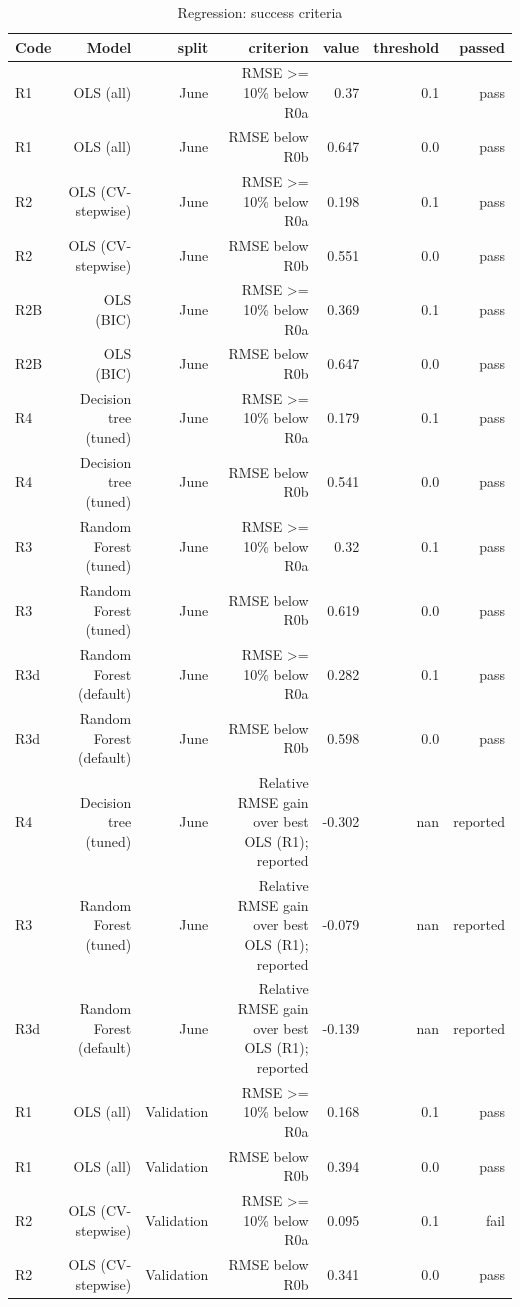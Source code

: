 \begin{table}[htbp]
\centering
\small
\caption{Regression: success criteria}
\begin{tabular}{lrrrrrr}
\toprule
Code & Model & split & criterion & value & threshold & passed \\
\midrule
R1 & OLS (all) & June & RMSE >= 10\% below R0a & 0.37 & 0.1 & pass \\
R1 & OLS (all) & June & RMSE below R0b & 0.647 & 0.0 & pass \\
R2 & OLS (CV-stepwise) & June & RMSE >= 10\% below R0a & 0.198 & 0.1 & pass \\
R2 & OLS (CV-stepwise) & June & RMSE below R0b & 0.551 & 0.0 & pass \\
R2B & OLS (BIC) & June & RMSE >= 10\% below R0a & 0.369 & 0.1 & pass \\
R2B & OLS (BIC) & June & RMSE below R0b & 0.647 & 0.0 & pass \\
R4 & Decision tree (tuned) & June & RMSE >= 10\% below R0a & 0.179 & 0.1 & pass \\
R4 & Decision tree (tuned) & June & RMSE below R0b & 0.541 & 0.0 & pass \\
R3 & Random Forest (tuned) & June & RMSE >= 10\% below R0a & 0.32 & 0.1 & pass \\
R3 & Random Forest (tuned) & June & RMSE below R0b & 0.619 & 0.0 & pass \\
R3d & Random Forest (default) & June & RMSE >= 10\% below R0a & 0.282 & 0.1 & pass \\
R3d & Random Forest (default) & June & RMSE below R0b & 0.598 & 0.0 & pass \\
R4 & Decision tree (tuned) & June & Relative RMSE gain over best OLS (R1); reported & -0.302 & nan & reported \\
R3 & Random Forest (tuned) & June & Relative RMSE gain over best OLS (R1); reported & -0.079 & nan & reported \\
R3d & Random Forest (default) & June & Relative RMSE gain over best OLS (R1); reported & -0.139 & nan & reported \\
R1 & OLS (all) & Validation & RMSE >= 10\% below R0a & 0.168 & 0.1 & pass \\
R1 & OLS (all) & Validation & RMSE below R0b & 0.394 & 0.0 & pass \\
R2 & OLS (CV-stepwise) & Validation & RMSE >= 10\% below R0a & 0.095 & 0.1 & fail \\
R2 & OLS (CV-stepwise) & Validation & RMSE below R0b & 0.341 & 0.0 & pass \\

\end{tabular}
\end{table}

